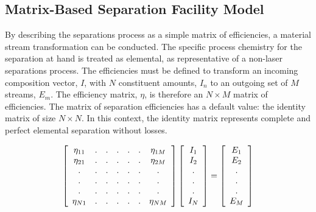 \subsection{Matrix-Based Separation Facility Model}

By describing the separations process as a simple matrix of efficiencies, a  
material stream transformation can be conducted. The specific process chemistry 
for the separation at hand is treated as elemental, as representative of a 
  non-laser separations process. The efficiencies must be defined to transform 
  an incoming composition vector, $I$, with $N$ constituent amounts, $I_n$ to an 
  outgoing set of $M$ streams, $E_m$. The efficiency matrix, $\eta$, is therefore 
  an $N\times M$ matrix of efficiencies. The matrix of separation efficiencies 
  has a default value: the identity matrix of size $N\times N$. In this 
  context, the identity matrix represents complete and perfect elemental 
  separation without losses. 

\begin{align}
  \left[
    \begin{array}{c c c c c c c}
      \eta_{11} & . & . & . & . & . & \eta_{1M} \\
      \eta_{21} & . & . & . & . & . & \eta_{2M} \\
      . & . & . & . & . & . & . \\
      . & . & . & . & . & . & . \\
      . & . & . & . & . & . & . \\
      \eta_{N1} & .  & . & . & . & . & \eta_{NM} \\
    \end{array}
    \right]
  \left[
    \begin{array}{c}
      I_1\\
      I_2\\
      . \\
      . \\
      . \\
      I_N\\
    \end{array}
    \right]
    =
    \left[
      \begin{array}{ c }
        E_1\\
        E_2\\
        .\\
        .\\
        .\\
        E_M\\
      \end{array}
      \right]
\label{defaultsep}
\end{align}

